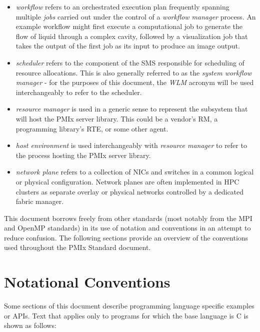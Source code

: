 \begin{itemize}
\item {}\emph{workflow} refers to an orchestrated execution plan frequently spanning multiple \emph{jobs} carried out under the control of a \emph{workflow manager} process. An example workflow might first execute a computational job to generate the flow of liquid through a complex cavity, followed by a visualization job that takes the output of the first job as its input to produce an image output.
\item {}\emph{scheduler} refers to the component of the \ac{SMS} responsible for scheduling of resource allocations. This is also generally referred to as the \emph{system workflow manager} - for the purposes of this document, the \emph{WLM} acronym will be used interchangeably to refer to the scheduler.
\item {}\emph{resource manager} is used in a generic sense to represent the subsystem that will host the \ac{PMIx} server library. This could be a vendor's \ac{RM}, a programming library's \ac{RTE}, or some other agent.
\item {}\emph{host environment} is used interchangeably with \emph{resource manager} to refer to the process hosting the \ac{PMIx} server library.
\item {}\emph{network plane} refers to a collection of \acp{NIC} and switches in a common logical or physical configuration. Network planes are often implemented in \ac{HPC} clusters as separate overlay or physical networks controlled by a dedicated fabric manager.
\end{itemize}


This document borrows freely from other standards (most notably from the \ac{MPI} and OpenMP standards) in its use of notation and conventions in an attempt to reduce confusion. The following sections provide an overview of the conventions used throughout the \ac{PMIx} Standard document.

\section{Notational Conventions}

Some sections of this document describe programming language specific examples or \acp{API}.
Text that applies only to programs for which the base language is C is shown as follows:

